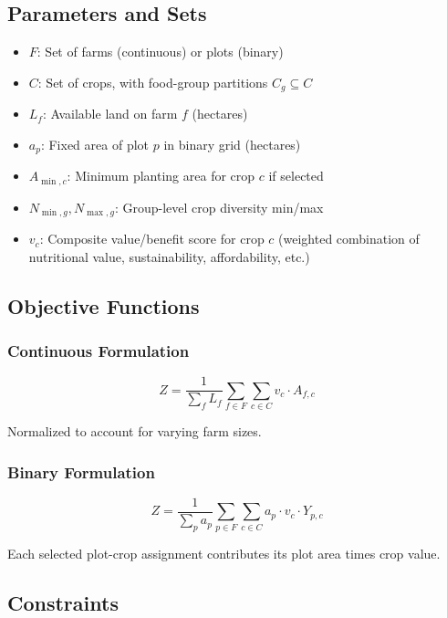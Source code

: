 \documentclass[11pt,a4paper]{article}
\begin{document}
\subsection{Parameters and Sets}

\begin{itemize}
    \item $F$: Set of farms (continuous) or plots (binary)
    \item $C$: Set of crops, with food-group partitions $C_g \subseteq C$
    \item $L_f$: Available land on farm $f$ (hectares)
    \item $a_p$: Fixed area of plot $p$ in binary grid (hectares)
    \item $A_{\min,c}$: Minimum planting area for crop $c$ if selected
    \item $N_{\min,g}, N_{\max,g}$: Group-level crop diversity min/max
    \item $v_c$: Composite value/benefit score for crop $c$ (weighted combination of nutritional value, sustainability, affordability, etc.)
\end{itemize}

\subsection{Objective Functions}

\subsubsection{Continuous Formulation}

\begin{equation}
Z = \frac{1}{\sum_{f} L_f} \sum_{f \in F} \sum_{c \in C} v_c \cdot A_{f,c}
\end{equation}

Normalized to account for varying farm sizes.

\subsubsection{Binary Formulation}

\begin{equation}
Z = \frac{1}{\sum_{p} a_p} \sum_{p \in F} \sum_{c \in C} a_p \cdot v_c \cdot Y_{p,c}
\end{equation}

Each selected plot-crop assignment contributes its plot area times crop value.

\subsection{Constraints}
\end{document}
